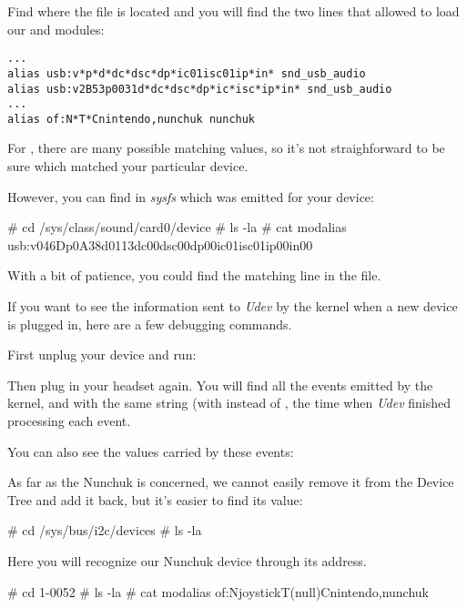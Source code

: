 Find where the  file is located and
you will find the two lines that allowed to load our
 and  modules:

\begin{verbatim}
...
alias usb:v*p*d*dc*dsc*dp*ic01isc01ip*in* snd_usb_audio
alias usb:v2B53p0031d*dc*dsc*dp*ic*isc*ip*in* snd_usb_audio
...
alias of:N*T*Cnintendo,nunchuk nunchuk

\end{verbatim}

For , there are many possible matching values,
so it's not straighforward to be sure which matched your particular
device.

However, you can find in {\em sysfs} which 
was emitted for your device:

\begin{bashinput}
# cd /sys/class/sound/card0/device
# ls -la
# cat modalias
usb:v046Dp0A38d0113dc00dsc00dp00ic01isc01ip00in00
\end{bashinput}

With a bit of patience, you could find the matching line in the
 file.

If you want to see the information sent to {\em Udev} by the
kernel when a new device is plugged in, here are a few debugging
commands.

First unplug your device and run:


Then plug in your headset again. You will find all the events emitted
by the kernel, and with the same string (with  instead of
, the time when {\em Udev} finished processing each event.

You can also see the  values carried by these events:


As far as the Nunchuk is concerned, we cannot easily remove it from the
Device Tree and add it back, but it's easier to find its 
value:

\begin{bashinput}
# cd /sys/bus/i2c/devices
# ls -la
\end{bashinput}

Here you will recognize our Nunchuk device through its 
address.

\begin{bashinput}
# cd 1-0052
# ls -la
# cat modalias
of:NjoystickT(null)Cnintendo,nunchuk
\end{bashinput}

